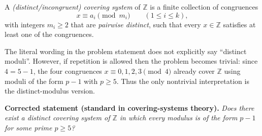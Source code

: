 A \emph{(distinct/incongruent) covering system} of $\mathbb{Z}$ is a finite collection of congruences
\[
x \equiv a_i \pmod{m_i}\qquad (1\le i\le k),
\]
with integers $m_i\ge 2$ that are \emph{pairwise distinct}, such that every $x\in\mathbb{Z}$ satisfies at least one of the congruences.

The literal wording in the problem statement does not explicitly say ``distinct moduli''.  However, if repetition is allowed then the problem becomes trivial: since $4 = 5-1$, the four congruences $x\equiv 0,1,2,3\pmod 4$ already cover $\mathbb{Z}$ using moduli of the form $p-1$ with $p\ge 5$.  Thus the only nontrivial interpretation is the distinct-modulus version.

\medskip
\noindent\textbf{Corrected statement (standard in covering-systems theory).}
\emph{Does there exist a distinct covering system of $\mathbb{Z}$ in which every modulus is of the form $p-1$ for some prime $p\ge 5$?}
